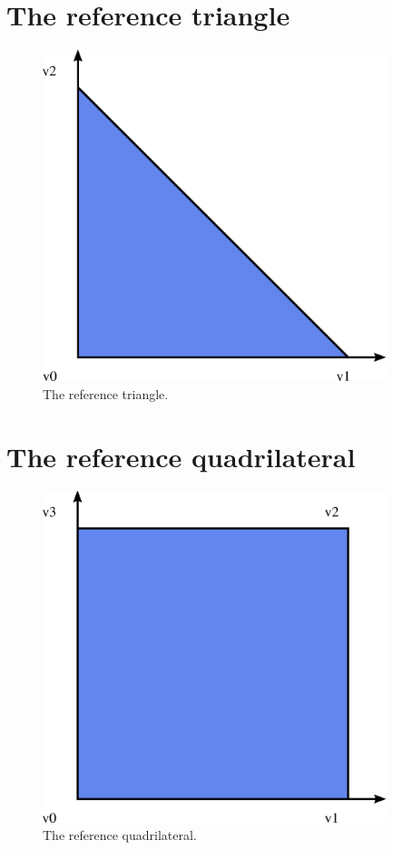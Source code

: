 \newpage
\section{The reference triangle}

\begin{figure}[H]
  \begin{center}
    \includegraphics[width=10cm]{eps/triangle.eps}
    \caption{The reference triangle.}
  \end{center}
\end{figure}

\newpage
\section{The reference quadrilateral}

\begin{figure}[H]
  \begin{center}
    \includegraphics[width=10cm]{eps/quadrilateral.eps}
    \caption{The reference quadrilateral.}
  \end{center}
\end{figure}

